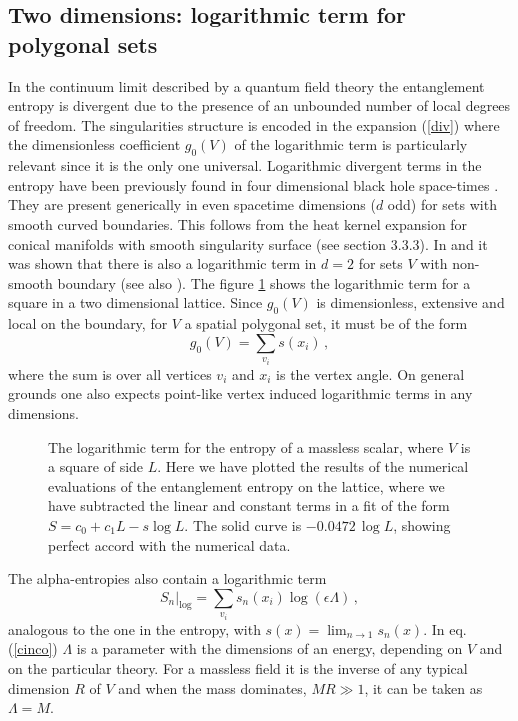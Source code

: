 \documentclass[11pt]{article}
\begin{document}
\subsection{Two dimensions: logarithmic term for polygonal sets}
In the continuum limit described by a quantum field theory the entanglement entropy is divergent due to the presence of an unbounded number of local degrees of freedom.  The singularities structure is encoded in the expansion (\ref{div}) where the dimensionless coefficient $g_0(V)$ of the logarithmic term is particularly relevant since it is the only one universal. 
Logarithmic divergent terms in the entropy have been previously found in four dimensional black hole space-times \cite{dos}. They are present generically in even spacetime dimensions ($d$ odd) for sets with smooth curved boundaries. This follows from the heat kernel expansion for conical manifolds with smooth singularity surface (see section 3.3.3). 
In \cite{log} and \cite{log1} it was shown that there is also a logarithmic term in $d=2$ for sets $V$ with non-smooth boundary (see also \cite{frolovangulo,frad}). The figure \ref{haha} shows the logarithmic term for a square in a two dimensional lattice. 
Since $g_0(V)$ is dimensionless, extensive and local on the boundary, for $V$ a spatial polygonal set, it must be of the form
\begin{equation}
g_0(V)=\sum_{v_i} s(x_i)\,,
\end{equation}       
where the sum is over all vertices $v_i$ and  $x_i$ is the vertex angle. On general grounds one also expects point-like vertex induced logarithmic  terms in any dimensions.

\begin{figure} [tbp]
\centering
\leavevmode
\epsfysize=5.3cm
\bigskip
{}
\caption{The logarithmic term for the entropy of a massless scalar, where $V$ is a square of side $L$. Here we have plotted the results of the numerical evaluations of the entanglement entropy on the lattice, where we have subtracted the linear and constant terms in a fit of the form $S=c_0+c_1 L-s \log L$. The solid curve is $-0.0472\,\log L$, showing perfect accord with the numerical data.}
\label{haha}
\end{figure}

The alpha-entropies also contain a logarithmic term 
\begin{equation}
\left.S_n\right|_{\log}=\sum_{v_i} s_n(x_i) \log(\epsilon \Lambda)\,, \label{cinco}
\end{equation} 
analogous to the one in the entropy, with $
s(x)=\lim_{n\rightarrow 1} s_n(x)$.
In eq. (\ref{cinco}) $\Lambda$ is a parameter with the dimensions of an energy, depending on $V$ and on the particular  theory. For a massless field it is the inverse of any typical dimension $R$ of $V$ and when the mass dominates, $MR\gg 1$, it can be taken  as $\Lambda=M$. 
\end{document}
